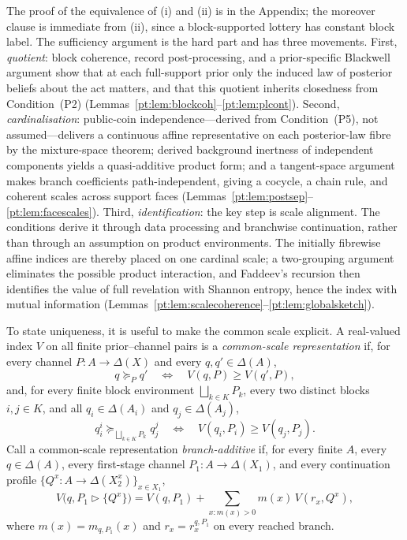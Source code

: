 \documentclass[11pt,a4paper]{article}
\theoremstyle{definition}
\newcommand{\1}{\mathbf 1}
\begin{document}
The proof of the equivalence of \textup{(i)} and \textup{(ii)} is in the Appendix; the moreover clause is immediate
from \textup{(ii)}, since a block-supported lottery has constant block label.  The sufficiency argument is the hard part and has three
movements.  First, \emph{quotient}: block coherence, record
post-processing, and a prior-specific Blackwell argument show that at each full-support prior only the induced law of
posterior beliefs about the act matters, and that this quotient inherits closedness from Condition~\textup{(P2)}
(Lemmas~\ref{pt:lem:blockcoh}--\ref{pt:lem:plcont}).  Second, \emph{cardinalisation}: public-coin independence---derived from
Condition~\textup{(P5)}, not assumed---delivers a continuous affine representative on each posterior-law fibre by the
mixture-space theorem; derived background inertness of independent components yields a quasi-additive product form; and
a tangent-space argument makes branch coefficients path-independent, giving a cocycle, a chain rule, and coherent
scales across support faces (Lemmas~\ref{pt:lem:postsep}--\ref{pt:lem:facescales}).  Third, \emph{identification}: the key
step is scale alignment.  The conditions derive it through data processing and branchwise continuation, rather than
through an assumption on product environments.  The initially fibrewise affine indices are thereby placed on one
cardinal scale; a two-grouping argument eliminates the possible product interaction, and Faddeev's recursion then
identifies the value of full revelation with Shannon entropy, hence the index with mutual information
(Lemmas~\ref{pt:lem:scalecoherence}--\ref{pt:lem:globalsketch}).

To state uniqueness, it is useful to make the common scale explicit.  A real-valued index $V$ on all finite
prior--channel pairs is a \emph{common-scale representation} if, for every channel $P:A\to\Delta(X)$ and every
$q,q'\in\Delta(A)$,
\[
q\succeq_Pq'
\quad\Longleftrightarrow\quad
V(q,P)\ge V(q',P),
\]
and, for every finite block environment $\bigsqcup_{k\in K}P_k$, every two distinct blocks $i,j\in K$, and all
$q_i\in\Delta(A_i)$ and $q_j\in\Delta(A_j)$,
\[
q_i^i\succeq_{\bigsqcup_{k\in K}P_k}q_j^j
\quad\Longleftrightarrow\quad
V(q_i,P_i)\ge V(q_j,P_j).
\]
Call a common-scale representation \emph{branch-additive} if, for every finite $A$, every $q\in\Delta(A)$, every
first-stage channel $P_1:A\to\Delta(X_1)$, and every continuation profile
$\{Q^x:A\to\Delta(X_2^x)\}_{x\in X_1}$,
\[
V\bigl(q,P_1\triangleright\{Q^x\}\bigr)
=
V(q,P_1)+\sum_{x:m(x)>0}m(x)\,V(r_x,Q^x),
\]
where $m(x)=m_{q,P_1}(x)$ and $r_x=r_x^{q,P_1}$ on every reached branch.
\end{document}
